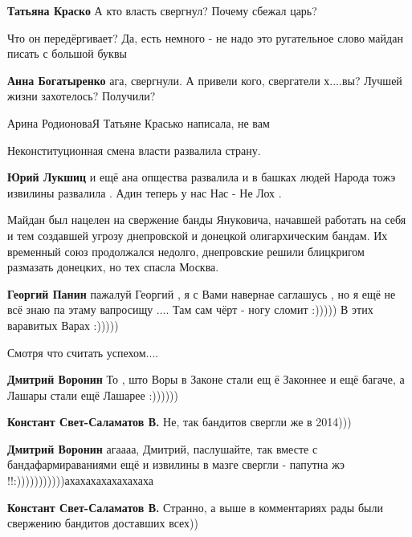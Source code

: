 \begin{itemize}
\begin{itemize}
\textbf{Татьяна Краско} А кто власть свергнул? Почему сбежал царь?

Что он передёргивает? Да, есть немного - не надо это ругательное слово майдан писать с большой буквы

\textbf{Анна Богатыренко} ага, свергнули. А привели кого, свергатели х....вы?
Лучшей жизни захотелось? Получили?

Арина РодионоваЯ Татьяне Красько написала, не вам
\end{itemize} %

Неконституционная смена власти развалила страну.

\textbf{Юрий Лукшиц} и ещё ана опщества развалила и в башках людей Народа тожэ извилины развалила . Адин теперь у нас Нас - Не Лох .



Майдан был нацелен на свержение банды Януковича, начавшей работать на себя и
тем создавшей угрозу днепровской и донецкой олигархическим бандам. Их временный
союз продолжался недолго, днепровские решили блицкригом размазать донецких, но
тех спасла Москва.

\begin{itemize} %
\textbf{Георгий Панин} пажалуй Георгий , я с Вами навернае саглашусь , но я ещё не всё знаю па этаму вапросищу .... Там сам чёрт - ногу сломит :))))) В этих варавитых Варах :)))))
\end{itemize} %

Смотря что считать успехом....

\begin{itemize} %
\textbf{Дмитрий Воронин} То , што Воры в Законе стали ещ ё Законнее и ещё багаче, а Лашары стали ещё Лашарее :))))))

\textbf{Констант Свет-Саламатов В.} Не, так бандитов свергли же в 2014)))

\textbf{Дмитрий Воронин} агаааа, Дмитрий, паслушайте, так вместе с бандафармираваниями ещё и извилины в мазге свергли - папутна жэ !!:)))))))))))ахахахахахахахаха

\textbf{Констант Свет-Саламатов В.} Странно, а выше в комментариях рады были свержению бандитов доставших всех))
\end{itemize} %


\end{itemize}
